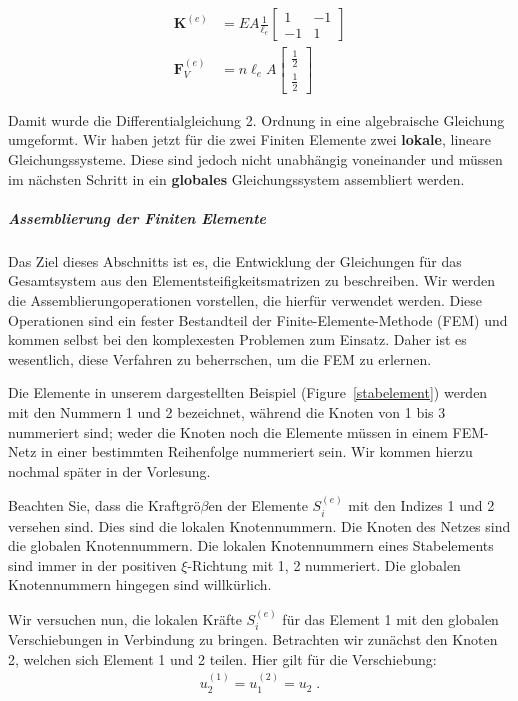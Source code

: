 \begin{align}
 \bm{K}^{(e)} & = EA \frac{1}{\ell_e} \begin{bmatrix} 1 & -1 \\ -1 & 1\end{bmatrix} \\
 \bm{F}_V^{(e)} & = n \ell_e A  \begin{bmatrix} \frac{1}{2} \\ \frac{1}{2} \end{bmatrix} 
\end{align}

Damit wurde die Differentialgleichung 2. Ordnung in eine algebraische Gleichung umgeformt. Wir haben jetzt für die zwei Finiten Elemente zwei \textbf{lokale}, lineare Gleichungssysteme. Diese sind jedoch nicht unabhängig voneinander und müssen im nächsten Schritt in ein \textbf{globales} Gleichungssystem assembliert werden.

\subparagraph{Assemblierung der Finiten Elemente}

Das Ziel dieses Abschnitts ist es, die Entwicklung der Gleichungen für das Gesamtsystem aus den Elementsteifigkeitsmatrizen zu beschreiben. Wir werden die Assemblierungoperationen vorstellen, die hierfür verwendet werden. Diese Operationen sind ein fester Bestandteil der Finite-Elemente-Methode (FEM) und kommen selbst bei den komplexesten Problemen zum Einsatz. Daher ist es wesentlich, diese Verfahren zu beherrschen, um die FEM zu erlernen.

Die Elemente in unserem dargestellten Beispiel (Figure~\ref{stabelement}) werden mit den Nummern 1 und 2 bezeichnet, während die Knoten von 1 bis 3 nummeriert sind; weder die Knoten noch die Elemente müssen in einem FEM-Netz in einer bestimmten Reihenfolge nummeriert sein. Wir kommen hierzu nochmal später in der Vorlesung.

Beachten Sie, dass die Kraftgrö$\beta$en der Elemente $S_i^{(e)}$ mit den Indizes 1 und 2 versehen sind. Dies sind die lokalen Knotennummern. Die Knoten des Netzes sind die globalen Knotennummern. Die lokalen Knotennummern eines Stabelements sind immer in der positiven $\xi$-Richtung mit 1, 2 nummeriert. Die globalen Knotennummern hingegen sind willkürlich.

Wir versuchen nun, die lokalen Kräfte $S_i^{(e)}$ für das Element 1 mit den globalen Verschiebungen in Verbindung zu bringen. Betrachten wir zunächst den Knoten 2, welchen sich Element 1 und 2 teilen. Hier gilt für die Verschiebung:
\begin{align}
  u_2^{(1)} = u_1^{(2)} = u_2 \; .
\end{align}


